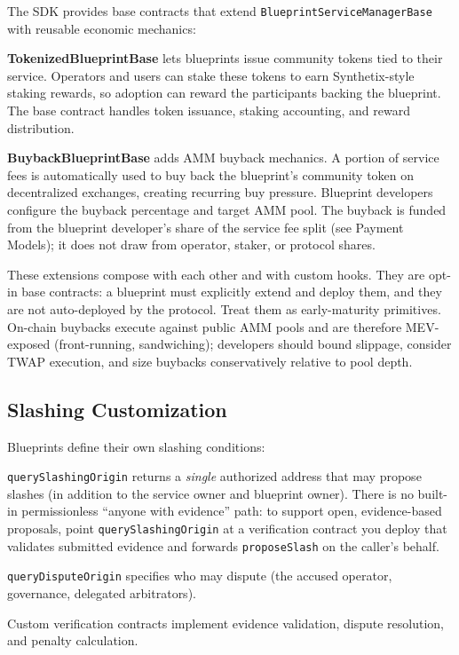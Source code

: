 \documentclass[11pt,a4paper]{article}
\begin{document}
The SDK provides base contracts that extend \texttt{BlueprintServiceManagerBase} with reusable economic mechanics:

\textbf{TokenizedBlueprintBase} lets blueprints issue community tokens tied to their service. Operators and users can stake these tokens to earn Synthetix-style staking rewards, so adoption can reward the participants backing the blueprint. The base contract handles token issuance, staking accounting, and reward distribution.

\textbf{BuybackBlueprintBase} adds AMM buyback mechanics. A portion of service fees is automatically used to buy back the blueprint's community token on decentralized exchanges, creating recurring buy pressure. Blueprint developers configure the buyback percentage and target AMM pool. The buyback is funded from the blueprint developer's share of the service fee split (see Payment Models); it does not draw from operator, staker, or protocol shares.

These extensions compose with each other and with custom hooks. They are opt-in base contracts: a blueprint must explicitly extend and deploy them, and they are not auto-deployed by the protocol. Treat them as early-maturity primitives. On-chain buybacks execute against public AMM pools and are therefore MEV-exposed (front-running, sandwiching); developers should bound slippage, consider TWAP execution, and size buybacks conservatively relative to pool depth.

\subsection{Slashing Customization}

Blueprints define their own slashing conditions:

\texttt{querySlashingOrigin} returns a \emph{single} authorized address that may propose slashes (in addition to the service owner and blueprint owner). There is no built-in permissionless ``anyone with evidence'' path: to support open, evidence-based proposals, point \texttt{querySlashingOrigin} at a verification contract you deploy that validates submitted evidence and forwards \texttt{proposeSlash} on the caller's behalf.

\texttt{queryDisputeOrigin} specifies who may dispute (the accused operator, governance, delegated arbitrators).

Custom verification contracts implement evidence validation, dispute resolution, and penalty calculation.
\end{document}
